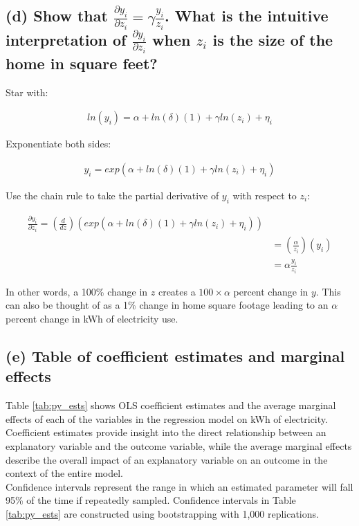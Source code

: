 \documentclass{article}
\begin{document}
\subsection*{(d) Show that $\frac{\partial y_i}{\partial z_i} = \gamma \frac{y_i}{z_i}$. What is the intuitive interpretation of $\frac{\partial y_i}{\partial z_i}$ when $z_i$ is the size of the home in square feet?}

Star with: 

\begin{align}
    ln(y_i) = \alpha + ln(\delta) (1) + \gamma ln(z_i) + \eta_i
\end{align}

Exponentiate both sides: 

\begin{align}
    y_i = exp(\alpha + ln(\delta) (1) + \gamma ln(z_i) + \eta_i) 
\end{align}

Use the chain rule to take the partial derivative of $y_i$ with respect to $z_i$: 

\begin{align}
    \frac{\partial y_i}{\partial z_i} = (\frac{d}{dz})(exp(\alpha + ln(\delta) (1) + \gamma ln(z_i) + \eta_i)) \\
    & = (\frac{\alpha}{z_i})(y_i) \\
    & = \alpha \frac{y_i}{z_i}
\end{align}

In other words, a 100\% change in $z$ creates a $100 \times \alpha$ percent change in $y$. This can also be thought of as a 1\% change in home square footage leading to an $\alpha$ percent change in kWh of electricity use.  


\newpage
\subsection*{(e) Table of coefficient estimates and marginal effects}

Table \ref{tab:py_ests} shows OLS coefficient estimates and the average marginal effects of each of the variables in the regression model on kWh of electricity. Coefficient estimates provide insight into the direct relationship between an explanatory variable and the outcome variable, while the average marginal effects describe the overall impact of an explanatory variable on an outcome in the context of the entire model.\\
Confidence intervals represent the range in which an estimated parameter will fall 95\% of the time if repeatedly sampled. Confidence intervals in Table \ref{tab:py_ests} are constructed using bootstrapping with 1,000 replications. 
\end{document}
